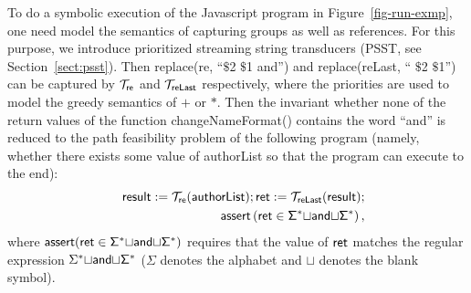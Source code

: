 To do a symbolic execution of the Javascript program in Figure~\ref{fig-run-exmp}, one need model the semantics of capturing groups as well as references. For this purpose, we introduce prioritized streaming string transducers (PSST, see Section~\ref{sect:psst}). Then {\sf replace(re, ``$\$$2 $\$$1 and'')} and {\sf replace(reLast, `` $\$$2 $\$$1'')} can be captured by $\mathcal{T}_{\sf re}$ and $\mathcal{T}_{\sf reLast}$ respectively, where the priorities are used to model the greedy semantics of $+$ or $*$. Then the invariant whether none of the return values of the function {\sf changeNameFormat()} contains the word ``and'' is reduced to the path feasibility problem of the following program (namely, whether there exists some value of {\sf authorList} so that the program can execute to the end): 
%
\begin{eqnarray}\label{eqn:exmp}
& & \sf result  := \sf  \mathcal{T}_{ re}(authorList); ret : = \mathcal{T}_{reLast}(result);\nonumber \\
& & \sf \textsf{assert}\left(ret \in \Sigma^*{\small\sqcup} and{\small\sqcup} \Sigma^*\right),
\end{eqnarray}
%
where $\sf assert(ret \in \Sigma^*{\small\sqcup}and{\small\sqcup}\Sigma^*)$ requires that the value of $\sf ret$ matches the regular expression $\Sigma^* {\small\sqcup}\sf and{\small\sqcup} \Sigma^*$ ($\Sigma$ denotes the alphabet and $\sqcup$ denotes the blank symbol).

